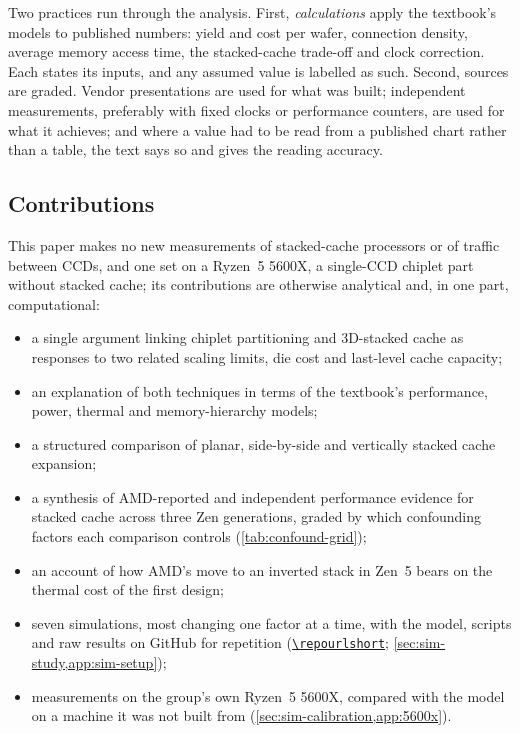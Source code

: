 Two practices run through the analysis. First, \emph{calculations} apply the textbook's models to published numbers: yield and cost per wafer, connection density, average memory access time, the stacked-cache trade-off and clock correction. Each states its inputs, and any assumed value is labelled as such. Second, sources are graded. Vendor presentations are used for what was built; independent measurements, preferably with fixed clocks or performance counters, are used for what it achieves; and where a value had to be read from a published chart rather than a table, the text says so and gives the reading accuracy.

\subsection{Contributions}
\label{sec:contributions}

This paper makes no new measurements of stacked-cache processors or of traffic between CCDs, and one set on a Ryzen~5 5600X, a single-CCD chiplet part without stacked cache; its contributions are otherwise analytical and, in one part, computational:
\begin{itemize}
  \item a single argument linking chiplet partitioning and 3D-stacked cache as responses to two related scaling limits, die cost and last-level cache capacity;
  \item an explanation of both techniques in terms of the textbook's performance, power, thermal and memory-hierarchy models;
  \item a structured comparison of planar, side-by-side and vertically stacked cache expansion;
  \item a synthesis of AMD-reported and independent performance evidence for stacked cache across three Zen generations, graded by which confounding factors each comparison controls (\cref{tab:confound-grid});
  \item an account of how AMD's move to an inverted stack in Zen~5 bears on the thermal cost of the first design;
  \item seven simulations, most changing one factor at a time, with the model, scripts and raw results on GitHub for repetition (\href{\repourl}{\nolinkurl{\repourlshort}}; \cref{sec:sim-study,app:sim-setup});
  \item measurements on the group's own Ryzen~5 5600X, compared with the model on a machine it was not built from (\cref{sec:sim-calibration,app:5600x}).
\end{itemize}

